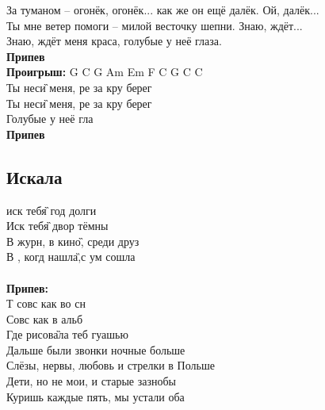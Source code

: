 \documentclass[fleqn,a5paper,12pt,twoside]{guitartabs}
\newcommand{\musVspace}{\vspace{2mm}}
\begin{document}
    За туманом -- огонёк, огонёк... как же он ещё далёк. Ой, далёк...\\
    Ты мне ветер помоги -- милой весточку шепни. Знаю, ждёт...\\
    Знаю, ждёт меня краса, голубые у неё глаза.\musVspace\\
    \musVspace
    \-\hspace{10mm}\textbf{Припев}\\
    \-\hspace{10mm}\textbf{Проигрыш:} G C G Am Em F C G C C\\
    Ты нес\G{и} меня, ре за кру берег\\
    Ты нес\G{и} меня, ре за кру берег\\
    Голубые у неё гла\musVspace\\
    \-\hspace{10mm}\textbf{Припев}
\newpage

\subsection*{Искала}

     иск теб\G{я} год долги\\
    Иск теб\G{я} двор тёмны\\
    В журн, в кин\G{о}, среди друз\\
    В , когд нашла,\G{ }с ум сошла\\
    \\
    \-\hspace{10mm}\textbf{Припев:}\\
    \-\hspace{10mm}Т совс как во сн\\
    \-\hspace{10mm}Совс как в альб\\
    \-\hspace{10mm}Где  рисов\G{ала} теб гуашью\\
    
    Дальше были звонки ночные больше\\
    Слёзы, нервы, любовь и стрелки в Польше\\
    Дети, но не мои, и старые зазнобы\\
    Куришь каждые пять, мы устали оба\\
\end{document}
